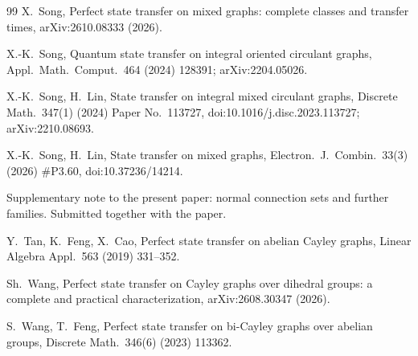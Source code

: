 \documentclass[preprint,11pt]{elsarticle}
\theoremstyle{definition}
\theoremstyle{remark}
\begin{document}
\begin{thebibliography}{99}
 X.\ Song, Perfect state transfer on mixed graphs: complete classes and transfer times, arXiv:2610.08333 (2026).

 X.-K.\ Song, Quantum state transfer on integral oriented circulant graphs, Appl.\ Math.\ Comput.\ 464 (2024) 128391; arXiv:2204.05026.

 X.-K.\ Song, H.\ Lin, State transfer on integral mixed circulant graphs, Discrete Math.\ 347(1) (2024) Paper No.~113727, doi:10.1016/j.disc.2023.113727; arXiv:2210.08693.

 X.-K.\ Song, H.\ Lin, State transfer on mixed graphs, Electron.\ J.\ Combin.\ 33(3) (2026) \#P3.60, doi:10.37236/14214.

 Supplementary note to the present paper: normal connection sets and further families. Submitted together with the paper.

 Y.\ Tan, K.\ Feng, X.\ Cao, Perfect state transfer on abelian Cayley graphs, Linear Algebra Appl.\ 563 (2019) 331--352.

 Sh.\ Wang, Perfect state transfer on Cayley graphs over dihedral groups: a complete and practical characterization, arXiv:2608.30347 (2026).

 S.\ Wang, T.\ Feng, Perfect state transfer on bi-Cayley graphs over abelian groups, Discrete Math.\ 346(6) (2023) 113362.

\end{thebibliography}
\end{document}

